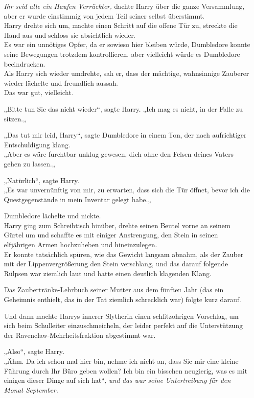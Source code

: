{\emph{Ihr seid alle ein Haufen Verrückter,} dachte Harry über die ganze Versammlung, aber er wurde einstimmig von jedem Teil seiner selbst überstimmt.\\ Harry drehte sich um, machte einen Schritt auf die offene Tür zu, streckte die Hand aus und schloss sie absichtlich wieder.\\ Es war ein unnötiges Opfer, da er sowieso hier bleiben würde, Dumbledore konnte seine Bewegungen trotzdem kontrollieren, aber vielleicht würde es Dumbledore beeindrucken.\\ Als Harry sich wieder umdrehte, sah er, dass der mächtige, wahnsinnige Zauberer wieder lächelte und freundlich aussah.\\ Das war gut, vielleicht.

„Bitte tun Sie das nicht wieder“, sagte Harry. „Ich mag es nicht, in der Falle zu sitzen.„

„Das tut mir leid, Harry“, sagte Dumbledore in einem Ton, der nach aufrichtiger Entschuldigung klang.\\ „Aber es wäre furchtbar unklug gewesen, dich ohne den Felsen deines Vaters gehen zu lassen.„

„Natürlich“, sagte Harry.\\ „Es war unvernünftig von mir, zu erwarten, dass sich die Tür öffnet, bevor ich die Questgegenstände in mein Inventar gelegt habe.„

Dumbledore lächelte und nickte.\\ Harry ging zum Schreibtisch hinüber, drehte seinen Beutel vorne an seinem Gürtel um und schaffte es mit einiger Anstrengung, den Stein in seinen elfjährigen Armen hochzuheben und hineinzulegen.\\ Er konnte tatsächlich spüren, wie das Gewicht langsam abnahm, als der Zauber mit der Lippenvergrößerung den Stein verschlang, und das darauf folgende Rülpsen war ziemlich laut und hatte einen deutlich klagenden Klang.

Das Zaubertränke-Lehrbuch seiner Mutter aus dem fünften Jahr (das ein Geheimnis enthielt, das in der Tat ziemlich schrecklich war) folgte kurz darauf.

Und dann machte Harrys innerer Slytherin einen schlitzohrigen Vorschlag, um sich beim Schulleiter einzuschmeicheln, der leider perfekt auf die Unterstützung der Ravenclaw-Mehrheitsfraktion abgestimmt war.

„Also“, sagte Harry.\\ „Ähm. Da ich schon mal hier bin, nehme ich nicht an, dass Sie mir eine kleine Führung durch Ihr Büro geben wollen? Ich bin ein bisschen neugierig, was es mit einigen dieser Dinge auf sich hat“, \emph{und das war seine Untertreibung für den Monat September.}

}
